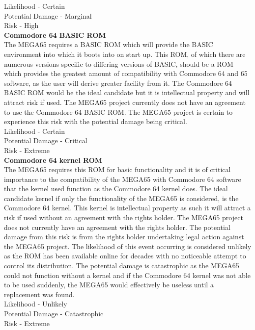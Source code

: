 Likelihood - Certain \\
Potential Damage - Marginal \\
Risk - High  \\


\textbf{Commodore 64 BASIC ROM}\\
The MEGA65 requires a BASIC ROM which will provide the BASIC environment into which it boots into on start up. This ROM, of which there are numerous versions specific to differing versions of BASIC, should be a ROM which provides the greatest amount of compatibility with Commodore 64 and 65 software, as the user will derive greater facility from it. The Commodore 64 BASIC ROM would be the ideal candidate but it is intellectual property and will attract risk if used. The MEGA65 project currently does not have an agreement to use the Commodore 64 BASIC ROM. The MEGA65 project is certain to experience this risk with the potential damage being critical. \\

Likelihood - Certain \\
Potential Damage - Critical \\
Risk - Extreme \\


\textbf{Commodore 64 kernel ROM}\\
The MEGA65 requires this ROM for basic functionality and it is of critical importance to the compatibility of the MEGA65 with Commodore 64 software that the kernel used function as the Commodore 64 kernel does. The ideal candidate kernel if only the functionality of the MEGA65 is considered, is the Commodore 64 kernel. This kernel is intellectual property as such it will attract a risk if used without an agreement with the rights holder. The MEGA65 project does not currently have an agreement with the rights holder. The potential damage from this risk is from the rights holder undertaking legal action against the MEGA65 project. The likelihood of this event occurring is considered unlikely as the ROM has been available online for decades with no noticeable attempt to control its distribution. The potential damage is catastrophic as the MEGA65 could not function without a kernel and if the Commodore 64 kernel was not able to be used suddenly, the MEGA65 would effectively be useless until a replacement was found. \\

Likelihood - Unlikely \\
Potential Damage - Catastrophic \\
Risk - Extreme \\


